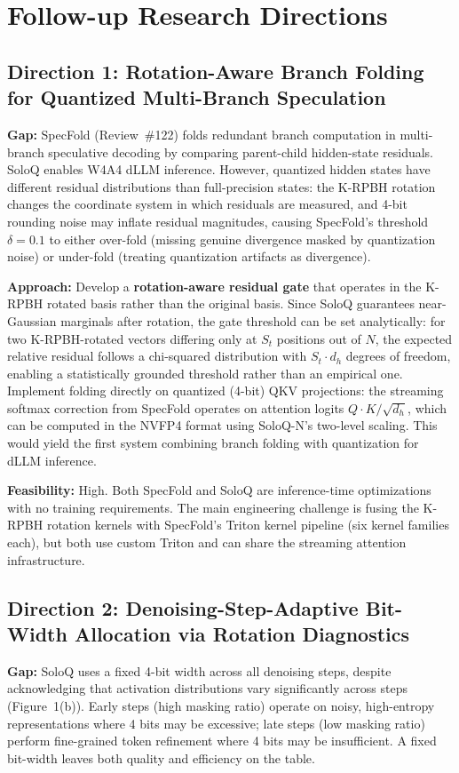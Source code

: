 \documentclass[11pt,a4paper]{article}
\begin{document}
\section{Follow-up Research Directions}

\subsection{Direction 1: Rotation-Aware Branch Folding for Quantized Multi-Branch Speculation}
\textbf{Gap:} SpecFold (Review~\#122) folds redundant branch computation in multi-branch speculative decoding by comparing parent-child hidden-state residuals. SoloQ enables W4A4 dLLM inference. However, quantized hidden states have different residual distributions than full-precision states: the K-RPBH rotation changes the coordinate system in which residuals are measured, and 4-bit rounding noise may inflate residual magnitudes, causing SpecFold's threshold $\delta{=}0.1$ to either over-fold (missing genuine divergence masked by quantization noise) or under-fold (treating quantization artifacts as divergence).

\textbf{Approach:} Develop a \textbf{rotation-aware residual gate} that operates in the K-RPBH rotated basis rather than the original basis. Since SoloQ guarantees near-Gaussian marginals after rotation, the gate threshold can be set analytically: for two K-RPBH-rotated vectors differing only at $S_t$ positions out of $N$, the expected relative residual follows a chi-squared distribution with $S_t \cdot d_h$ degrees of freedom, enabling a statistically grounded threshold rather than an empirical one. Implement folding directly on quantized (4-bit) QKV projections: the streaming softmax correction from SpecFold operates on attention logits $Q \cdot K / \sqrt{d_h}$, which can be computed in the NVFP4 format using SoloQ-N's two-level scaling. This would yield the first system combining branch folding with quantization for dLLM inference.

\textbf{Feasibility:} High. Both SpecFold and SoloQ are inference-time optimizations with no training requirements. The main engineering challenge is fusing the K-RPBH rotation kernels with SpecFold's Triton kernel pipeline (six kernel families each), but both use custom Triton and can share the streaming attention infrastructure.

\subsection{Direction 2: Denoising-Step-Adaptive Bit-Width Allocation via Rotation Diagnostics}
\textbf{Gap:} SoloQ uses a fixed 4-bit width across all denoising steps, despite acknowledging that activation distributions vary significantly across steps (Figure~1(b)). Early steps (high masking ratio) operate on noisy, high-entropy representations where 4 bits may be excessive; late steps (low masking ratio) perform fine-grained token refinement where 4 bits may be insufficient. A fixed bit-width leaves both quality and efficiency on the table.
\end{document}
